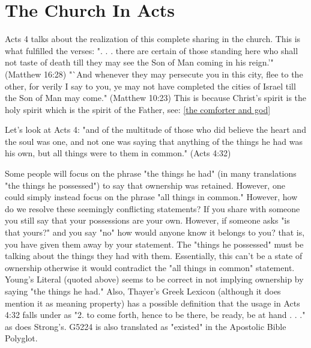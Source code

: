 \documentclass[11pt]{article}
\begin{document}
\section{The Church In Acts}

Acts 4 talks about the realization of this complete sharing in the church. This is what fulfilled the verses: ". . . there are certain of those standing here who shall not taste of death till they may see the Son of Man coming in his reign.'" (Matthew 16:28) "`And whenever they may persecute you in this city, flee to the other, for verily I say to you, ye may not have completed the cities of Israel till the Son of Man may come." (Matthew 10:23) This is because Christ's spirit is the holy spirit which is the spirit of the Father, see: \ref{the comforter and god} 

Let's look at Acts 4:
"and of the multitude of those who did believe the heart and the soul was one, and not one was saying that anything of the things he had was his own, but all things were to them in common." (Acts 4:32)

Some people will focus on the phrase "the things he had" (in many translations "the things he possessed") to say that ownership was retained. However, one could simply instead focus on the phrase "all things in common." However, how do we resolve these seemingly conflicting statements? If you share with someone you still say that your possessions are your own. However, if someone asks "is that yours?" and you say "no" how would anyone know it belongs to you? that is, you have given them away by your statement. The "things he possessed" must be talking about the things they had with them. Essentially, this can't be a state of ownership otherwise it would contradict the "all things in common" statement. 
Young's Literal (quoted above) seems to be correct in not implying ownership by saying "the things he had." Also, Thayer's Greek Lexicon (although it does mention it as meaning property) has a possible definition that the usage in Acts 4:32 falls under as "2. to come forth, hence to be there, be ready, be at hand . . ." as does Strong's.\cite{possessions thayer's strong's} G5224 is also translated as "existed" in the Apostolic Bible Polyglot.\cite{G5224 apostolic bible polyglot} 
\end{document}
